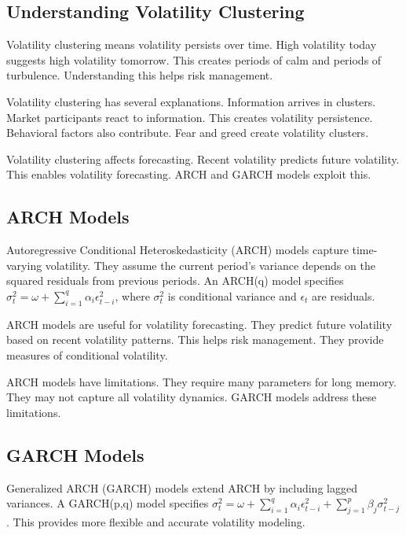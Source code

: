 \subsection{Understanding Volatility Clustering}

Volatility clustering means volatility persists over time. High volatility today suggests high volatility tomorrow. This creates periods of calm and periods of turbulence. Understanding this helps risk management.

Volatility clustering has several explanations. Information arrives in clusters. Market participants react to information. This creates volatility persistence. Behavioral factors also contribute. Fear and greed create volatility clusters.

Volatility clustering affects forecasting. Recent volatility predicts future volatility. This enables volatility forecasting. ARCH and GARCH models exploit this.

\subsection{ARCH Models}

Autoregressive Conditional Heteroskedasticity (ARCH) models capture time-varying volatility. They assume the current period's variance depends on the squared residuals from previous periods. An ARCH(q) model specifies \(\sigma_t^2 = \omega + \sum_{i=1}^{q} \alpha_i \epsilon_{t-i}^2\), where \(\sigma_t^2\) is conditional variance and \(\epsilon_t\) are residuals.

ARCH models are useful for volatility forecasting. They predict future volatility based on recent volatility patterns. This helps risk management. They provide measures of conditional volatility.

ARCH models have limitations. They require many parameters for long memory. They may not capture all volatility dynamics. GARCH models address these limitations.

\subsection{GARCH Models}

Generalized ARCH (GARCH) models extend ARCH by including lagged variances. A GARCH(p,q) model specifies \(\sigma_t^2 = \omega + \sum_{i=1}^{q} \alpha_i \epsilon_{t-i}^2 + \sum_{j=1}^{p} \beta_j \sigma_{t-j}^2\). This provides more flexible and accurate volatility modeling.

